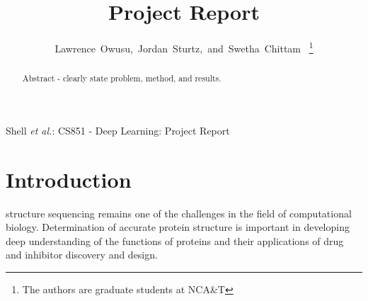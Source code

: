 \documentclass[journal]{IEEEtran}
\begin{document}
%
\title{Project Report}

\author{Lawrence~Owusu,~Jordan~Sturtz,~and~Swetha~Chittam~%
  \thanks{The authors are graduate students at NCA\&T}%
}


%
{Shell \MakeLowercase{\textit{et al.}}: CS851 - Deep Learning: Project Report}

\maketitle

\begin{abstract}
Abstract - clearly state problem, method, and results.
\end{abstract}



%
\IEEEpeerreviewmaketitle

\section{Introduction}
   structure sequencing remains one of the challenges in the field of computational biology.
    Determination of accurate protein structure is important in developing deep understanding of the
    functions of proteins and their applications of drug and inhibitor discovery and design.
\end{document}
